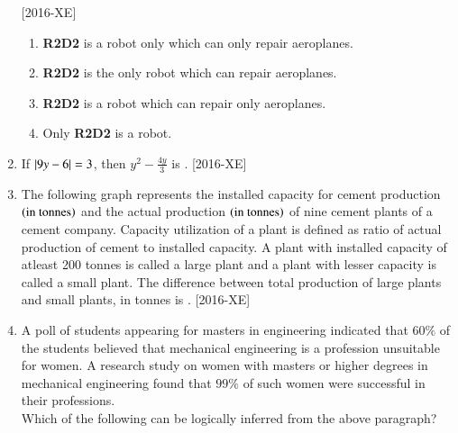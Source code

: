 \documentclass[journal]{IEEEtran}
\begin{document}
\begin{enumerate}
    \hfill{[2016-XE]}
\begin{enumerate}
    \item \textbf{R2D2} is a robot only which can only repair aeroplanes.
    \item \textbf{R2D2} is the only robot which can repair aeroplanes.
    \item \textbf{R2D2} is a robot which can  repair only aeroplanes.
    \item Only \textbf{R2D2} is a robot.
\end{enumerate}
\item If $\left\vert9y-6\right\vert=3$, then $y^2-\frac{4y}{3}$ is \underline{\hspace{1cm}}. \hfill{[2016-XE]}
\begin{enumerate}
\end{enumerate}
\item The following graph represents the installed capacity for cement production $\left(\text{in tonnes}\right)$ and the actual production $\left(\text{in tonnes}\right)$ of nine cement plants of a cement company. Capacity utilization of a plant is defined as ratio of actual production of cement to installed capacity. A plant with installed capacity of atleast 200 tonnes is called a large plant and a plant with lesser capacity is called a small plant. The difference between total production of large plants and small plants, in tonnes is \underline{\hspace{1cm}}. \hfill{[2016-XE]}\\
\begin{figure}[H]
			\centering
			
			\label{6}
		\end{figure}

\item A poll of students appearing for masters in engineering indicated that $60\%$ of the students believed that mechanical engineering is a profession unsuitable for women. A research study on women with masters or higher degrees in mechanical engineering found that $99 \%$ of such women were successful in their professions.\\

Which of the following can be logically inferred from the above paragraph? 


\end{enumerate}
\end{document}
